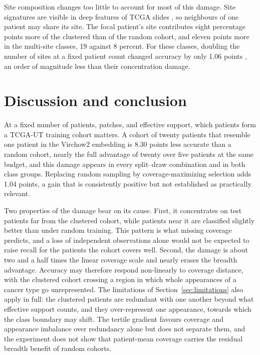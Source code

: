 \noindent Site composition changes too little to account for most of this damage. Site signatures are visible in deep features of TCGA slides \citep{howard2021impact}, so neighbours of one patient may share its site. The focal patient's site contributes eight percentage points more of the clustered than of the random cohort, and eleven points more in the multi-site classes, 19 against 8 percent. For these classes, doubling the number of sites at a fixed patient count changed accuracy by only 1.06 points \citep{queisler2026siteCoverage}, an order of magnitude less than their concentration damage.

\section{Discussion and conclusion}
\label{sec:discussion}
At a fixed number of patients, patches, and effective support, which patients form a TCGA-UT training cohort matters. A cohort of twenty patients that resemble one patient in the Virchow2 embedding is 8.30 points less accurate than a random cohort, nearly the full advantage of twenty over five patients at the same budget, and this damage appears in every split--draw combination and in both class groups. Replacing random sampling by coverage-maximizing selection adds 1.04 points, a gain that is consistently positive but not established as practically relevant.

Two properties of the damage bear on its cause. First, it concentrates on test patients far from the clustered cohort, while patients near it are classified slightly better than under random training. This pattern is what missing coverage predicts, and a loss of independent observations alone would not be expected to raise recall for the patients the cohort covers well. Second, the damage is about two and a half times the linear coverage scale and nearly erases the breadth advantage. Accuracy may therefore respond non-linearly to coverage distance, with the clustered cohort crossing a region in which whole appearances of a cancer type go unrepresented. The limitations of Section~\ref{sec:limitations} also apply in full: the clustered patients are redundant with one another beyond what effective support counts, and they over-represent one appearance, towards which the class boundary may shift. The tertile gradient favours coverage and appearance imbalance over redundancy alone but does not separate them, and the experiment does not show that patient-mean coverage carries the residual breadth benefit of random cohorts.

